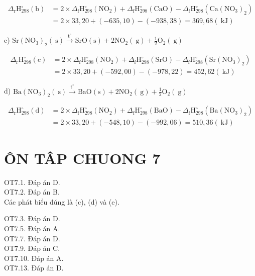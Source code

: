 \documentclass[10pt]{article}
\begin{document}
$$
\begin{aligned}
\Delta_{\mathrm{r}} \mathrm{H}_{298}^{\circ}(\mathrm{b}) & =2 \times \Delta_{\mathrm{f}} \mathrm{H}_{298}^{\circ}\left(\mathrm{NO}_{2}\right)+\Delta_{\mathrm{f}} \mathrm{H}_{298}^{\circ}(\mathrm{CaO})-\Delta_{\mathrm{f}} \mathrm{H}_{298}^{\circ}\left(\mathrm{Ca}\left(\mathrm{NO}_{3}\right)_{2}\right) \\
& =2 \times 33,20+(-635,10)-(-938,38)=369,68(\mathrm{~kJ})
\end{aligned}
$$

c) $\mathrm{Sr}\left(\mathrm{NO}_{3}\right)_{2}(\mathrm{~s}) \xrightarrow{\mathrm{t}^{\circ}} \mathrm{SrO}(\mathrm{s})+2 \mathrm{NO}_{2}(\mathrm{~g})+\frac{1}{2} \mathrm{O}_{2}(\mathrm{~g})$

$$
\begin{aligned}
\Delta_{\mathrm{r}} \mathrm{H}_{298}^{\circ}(\mathrm{c}) & =2 \times \Delta_{\mathrm{f}} \mathrm{H}_{298}^{\circ}\left(\mathrm{NO}_{2}\right)+\Delta_{\mathrm{f}} \mathrm{H}_{298}^{\circ}(\mathrm{SrO})-\Delta_{\mathrm{f}} \mathrm{H}_{298}^{\circ}\left(\mathrm{Sr}\left(\mathrm{NO}_{3}\right)_{2}\right) \\
& =2 \times 33,20+(-592,00)-(-978,22)=452,62(\mathrm{~kJ})
\end{aligned}
$$

d) $\mathrm{Ba}\left(\mathrm{NO}_{3}\right)_{2}(\mathrm{~s}) \xrightarrow{\mathrm{t}^{\circ}} \mathrm{BaO}(\mathrm{s})+2 \mathrm{NO}_{2}(\mathrm{~g})+\frac{1}{2} \mathrm{O}_{2}(\mathrm{~g})$

$$
\begin{aligned}
\Delta_{\mathrm{r}} \mathrm{H}_{298}^{\circ}(\mathrm{d}) & =2 \times \Delta_{\mathrm{f}} \mathrm{H}_{298}^{\circ}\left(\mathrm{NO}_{2}\right)+\Delta_{\mathrm{f}} \mathrm{H}_{298}^{\circ}(\mathrm{BaO})-\Delta_{\mathrm{f}} \mathrm{H}_{298}^{\circ}\left(\mathrm{Ba}\left(\mathrm{NO}_{3}\right)_{2}\right) \\
& =2 \times 33,20+(-548,10)-(-992,06)=510,36(\mathrm{~kJ})
\end{aligned}
$$

\section*{ÔN TÂP CHUONG 7}
OT7.1. Đáp án D.\\
OT7.2. Đáp án B.\\
Các phát biểu đúng là (c), (d) và (e).

OT7.3. Đáp án D.\\
OT7.5. Đáp án A.\\
OT7.7. Đáp án D.\\
OT7.9. Đáp án C.\\
OT7.10. Đáp án A.\\
OT7.13. Đáp án D.
\end{document}

